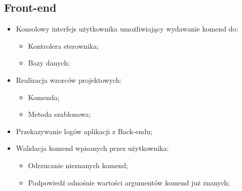 \subsection{Front-end}
\begin{itemize}
	\item Konsolowy interfejs użytkownika umożliwiający wydawanie komend do:
	\begin{itemize}
		\item Kontrolera sterownika;
		\item Bazy danych;
	\end{itemize}
	\item Realizacja wzorców projektowych:
	\begin{itemize}
		\item Komenda;
		\item Metoda szablonowa;
	\end{itemize}
	\item Przekazywanie logów aplikacji z Back-endu;
	\item Walidacja komend wpisanych przez użytkownika:
	\begin{itemize}
		\item Odrzucanie nieznanych komend;
		\item Podpowiedź odnośnie wartości argumentów komend już znanych;
	\end{itemize}
\end{itemize}

